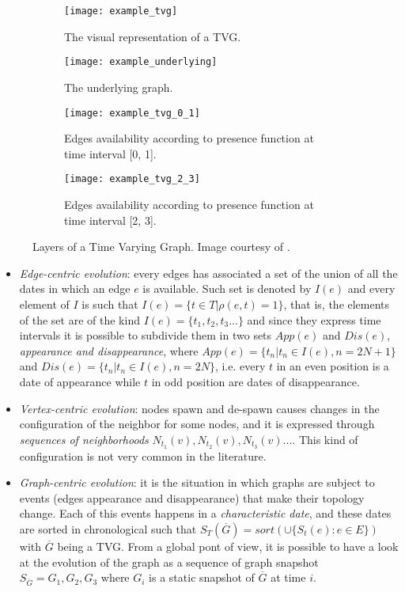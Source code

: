 	\begin{figure}
		\begin{subfigure}{0.5\textwidth}
			\centering
			\texttt{[image: example\_tvg]}
			\caption{The visual representation of a TVG.}
		\end{subfigure}
		\begin{subfigure}{0.5\textwidth}
			\centering
			\texttt{[image: example\_underlying]}
			\caption{The underlying graph.}
		\end{subfigure}
		\begin{subfigure}{0.5\textwidth}
			\centering
			\texttt{[image: example\_tvg\_0\_1]}
			\caption{Edges availability according to presence function at time interval [0, 1].}
		\end{subfigure}
		\begin{subfigure}{0.5\textwidth}
			\centering
			\texttt{[image: example\_tvg\_2\_3]}
			\caption{Edges availability according to presence function at time interval [2, 3].}
		\end{subfigure}
		\caption{Layers of a Time Varying Graph. Image courtesy of \cite{Casteigts2012}.}
	\end{figure}
	
	\begin{itemize}
		\item \textit{Edge-centric evolution}: every edges has associated a set of the union of all the dates in which an edge \(e\) is available. Such set is denoted by \(I(e)\) and every element of \(I\) is such that \(I(e) = \{t \in T | \rho(e,t) = 1\}\), that is, the elements of the set are of the kind \(I(e) = \{t_1, t_2, t_3 ... \}\) and since they express time intervals it is possible to subdivide them in two sets \(App(e)\) and \(Dis(e)\), \textit{appearance and disappearance}, where \(App(e) = \{t_n | t_n \in I(e), n = 2N + 1\}\) and \(Dis(e) = \{t_n | t_n \in I(e), n = 2N\}\), i.e. every \(t\) in an even position is a date of appearance while \(t\) in odd position are dates of disappearance.
		
		\item \textit{Vertex-centric evolution}: nodes spawn and de-spawn causes changes in the configuration of the neighbor for some nodes, and it is expressed through \textit{sequences of neighborhoods} \(N_{t_1}(v), N_{t_2}(v), N_{t_3}(v) ...\). This kind of configuration is not very common in the literature.
		
		\item \textit{Graph-centric evolution}: it is the situation in which graphs are subject to events (edges appearance and disappearance) that make their topology change. Each of this events happens in a \textit{characteristic date}, and these dates are sorted in chronological such that \(S_{T}(\overline{G}) = sort(\cup\{S_t(e) : e \in E\})\) with \( \overline{G}\) being a TVG. From a global pont of view, it is possible to have a look at the evolution of the graph as a sequence of graph snapshot \(S_{\overline{G}} = G_1, G_2, G_3\) where \(G_i\) is a static snapshot of \(\overline{G}\) at time \(i\).
	\end{itemize}
	
